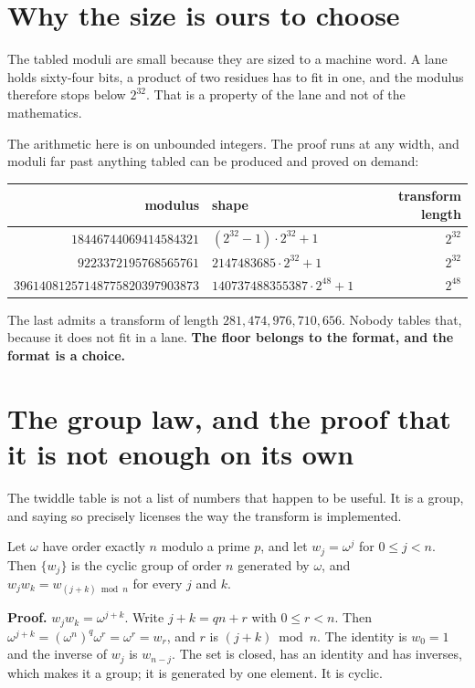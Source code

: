 \section{Why the size is ours to choose}

The tabled moduli are small because they are sized to a machine word. A lane holds sixty-four bits, a product of two residues has to fit in one, and the modulus therefore stops below \(2^{32}\). That is a property of the lane and not of the mathematics.

The arithmetic here is on unbounded integers. The proof runs at any width, and moduli far past anything tabled can be produced and proved on demand:

\begin{center}
\begin{tabular}{@{}rlr@{}}
\toprule
modulus & shape & transform length \\
\midrule
\(18446744069414584321\) & \((2^{32}-1) \cdot 2^{32} + 1\) & \(2^{32}\) \\
\(9223372195768565761\) & \(2147483685 \cdot 2^{32} + 1\) & \(2^{32}\) \\
\(39614081257148775820397903873\) & \(140737488355387 \cdot 2^{48} + 1\) & \(2^{48}\) \\
\bottomrule
\end{tabular}
\end{center}

The last admits a transform of length \(281{,}474{,}976{,}710{,}656\). Nobody tables that, because it does not fit in a lane. \textbf{The floor belongs to the format, and the format is a choice.}

\section{The group law, and the proof that it is not enough on its own}

The twiddle table is not a list of numbers that happen to be useful. It is a group, and saying so precisely licenses the way the transform is implemented.

\begin{proposition}
Let \(\omega\) have order exactly \(n\) modulo a prime \(p\), and let \(w_j = \omega^j\) for \(0 \le j < n\). Then \(\{w_j\}\) is the cyclic group of order \(n\) generated by \(\omega\), and \(w_j w_k = w_{(j+k) \bmod n}\) for every \(j\) and \(k\).
\end{proposition}

\textbf{Proof.} \(w_j w_k = \omega^{j+k}\). Write \(j + k = qn + r\) with \(0 \le r < n\). Then \(\omega^{j+k} = (\omega^n)^q \omega^r = \omega^r = w_r\), and \(r\) is \((j+k) \bmod n\). The identity is \(w_0 = 1\) and the inverse of \(w_j\) is \(w_{n-j}\). The set is closed, has an identity and has inverses, which makes it a group; it is generated by one element. It is cyclic. \qedsymbol


